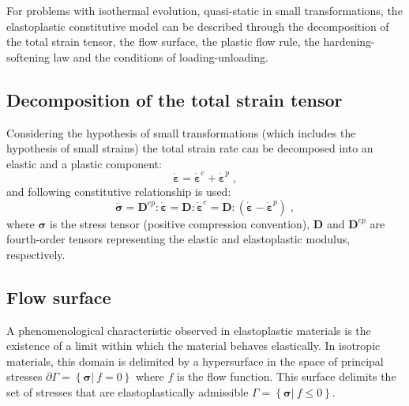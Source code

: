 \documentclass[Journal,letterpaper]{ascelike-new}
\newcommand{\Dsdee}{\boldsymbol{D}}
\newcommand{\Dsdep}{\boldsymbol{D}^{ep}}
\newcommand{\dstrain}{\boldsymbol{\dot{\varepsilon}}}
\newcommand{\dstraine}{\boldsymbol{\dot{\varepsilon}}^{e}}
\newcommand{\dstrainp}{\boldsymbol{\dot{\varepsilon}}^{p}}
\newcommand{\dstress}{\boldsymbol{\dot{\sigma}}}
\newcommand{\stress}{\boldsymbol{\sigma}}
\begin{document}
For problems with isothermal evolution, quasi-static in small transformations, the elastoplastic constitutive model can be described through the decomposition of the total strain tensor, the flow surface, the plastic flow rule, the hardening-softening law and the conditions of loading-unloading.

\subsection{Decomposition of the total strain tensor}

Considering the hypothesis of small transformations (which includes the hypothesis of small strains) the total strain rate can be decomposed into an elastic and a plastic component:
\begin{equation} \label{eq_decomposition_plastic}
    \dstrain=\dstraine + \dstrainp\;,
\end{equation}
and following constitutive relationship is used:
\begin{equation} \label{eq_constitutive_relationship_plastic}
    \dstress = \Dsdep : \dstrain = \Dsdee : \dstraine = \Dsdee : (\dstrain - \dstrainp)\;,
\end{equation}
where $\stress$ is the stress tensor (positive compression convention), $\Dsdee$  and $\Dsdep$ are fourth-order tensors representing the elastic and elastoplastic modulus, respectively.

\subsection{Flow surface}

A phenomenological characteristic observed in elastoplastic
materials is the existence of a limit within which the material behaves elastically. In isotropic materials, this domain is delimited by a hypersurface in the space of principal stresses $\partial \Gamma = \left\{ \stress |~f = 0 \right\}$ where $f$ is the flow function. This surface delimits the set of stresses that are elastoplastically admissible $\Gamma = \left\{ \stress | ~f \leq 0 \right\}$.
\end{document}
